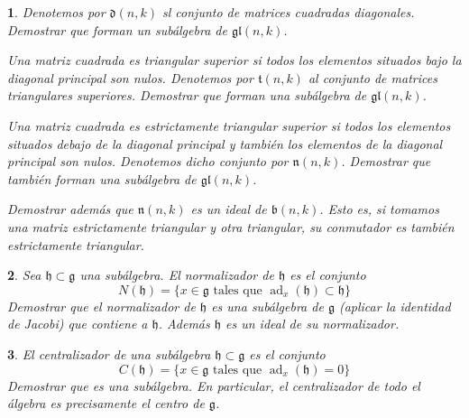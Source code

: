 \documentclass[a4paper,draft,12pt]{article}
\newtheorem{pro1}{}%
\newenvironment{pro}{\begin{pro1} \rm} {\end{pro1}}
\newcommand{\g}{\mathfrak{g}}%
\newcommand{\df}[1]{\textsf{\color{blue}#1}}
\DeclareMathOperator{\ad}{ad}  %
\begin{document}
\begin{pro}

Denotemos por $\mathfrak{d}(n,k)$ sl conjunto de matrices cuadradas diagonales. Demostrar que forman un subálgebra de $\mathfrak{gl}(n,k)$.

Una matriz cuadrada es \df{triangular superior}  si todos los elementos situados bajo la diagonal principal son nulos. Denotemos por $\mathfrak{t}(n,k)$ al conjunto de matrices triangulares superiores. Demostrar que forman una subálgebra de $\mathfrak{gl}(n,k)$.

Una matriz cuadrada es \df{estrictamente triangular superior}  si todos los elementos situados debajo de la diagonal principal y también los elementos de la diagonal principal son nulos. Denotemos dicho conjunto por $\mathfrak{n}(n,k)$. Demostrar que también forman una subálgebra de $\mathfrak{gl}(n,k)$.

Demostrar además que  $\mathfrak{n}(n,k)$ es un ideal de $\mathfrak{b}(n,k)$. Esto es, si tomamos una matriz estrictamente triangular y otra triangular, su conmutador es también estrictamente triangular.

\end{pro}

\begin{pro}

 Sea $\mathfrak{h} \subset \g$ una subálgebra.  El \df{normalizador}  de $\mathfrak{h}$ es el conjunto
\[
N(\mathfrak{h})= \{ x  \in \g \text{ tales que } \ad_x(\mathfrak{h})\subset \mathfrak{h}\}
\]
Demostrar que el  normalizador de $\mathfrak{h}$ es una subálgebra de $\g$ (aplicar la identidad de Jacobi) que contiene a $\mathfrak{h}$.  Además $\mathfrak{h}$ es un ideal de su normalizador.

\end{pro}


\begin{pro}

 El \df{centralizador}  de una subálgebra $\mathfrak{h} \subset \g$ es el conjunto
\[
C(\mathfrak{h})= \{ x \in \g \text{ tales que } \ad_x(\mathfrak{h})=0\}
\]
Demostrar que es  una subálgebra. En particular, el centralizador de todo el álgebra es precisamente el centro de $\g$.

\end{pro}
\end{document}
